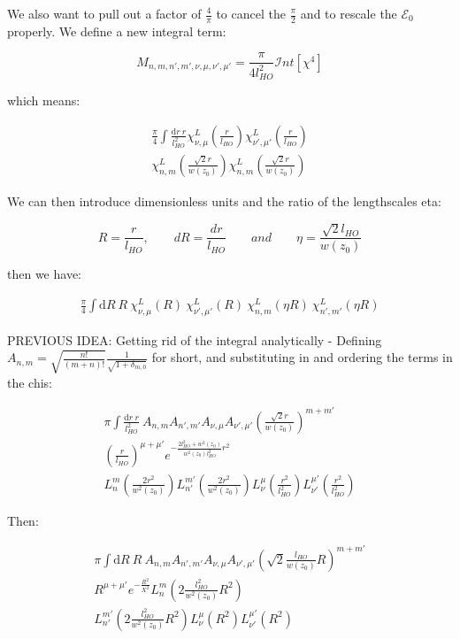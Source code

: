 \documentclass[a4paper,twocolumn,nobalancelastpage]{revtex4-1}
\newcommand{\lho}{l_{HO}}
\newcommand{\wz}{w(z_0)}
\newcommand{\chiaf}{\chi_{\nu,\mu}^L\left(\frac{r}{\lho}\right)}
\newcommand{\chiafp}{\chi_{\nu',\mu'}^L\left(\frac{r}{\lho}\right)}
\newcommand{\chilf}{\chi_{n,m}^L\left(\frac{\sqrt{2}r}{w(z_0)}\right)}
\newcommand{\chilfp}{\chi_{n,m}^L\left(\frac{\sqrt{2}r}{w(z_0)}\right)}
\newcommand{\intfour}{\mathcal{I}nt[\chi^4]}
\begin{document}
We also want to pull out a factor of $\frac{4}{\pi}$ to cancel the $\frac{\pi}{2}$ and to rescale the $\mathcal{E}_0$ properly. We define a new integral term:

\begin{equation}
M_{n,m,n',m',\nu,\mu,\nu',\mu'}= \frac{\pi}{4 \lho^2} \intfour
\end{equation}

which means:

\begin{multline}
 \frac{\pi}{4} \int \frac{\mathrm{d}r \ r}{l^2_{HO}} \chiaf \chiafp \\ \chilf \chilfp
\end{multline}

We can then introduce dimensionless units and the ratio of the lengthscales eta:

\begin{equation}
R=\frac{r}{l_{HO}}, \qquad dR=\frac{dr}{l_{HO}} \qquad and \qquad \eta=\frac{\sqrt{2}\lho}{\wz} 
\end{equation}

then we have:

\begin{multline}
 \frac{\pi}{4} \int \mathrm{d}R \ R \ \chi_{\nu, \mu}^L (R) \ \chi_{\nu', \mu'}^L (R) \ \chi_{n,m}^L (\eta R) \ \chi_{n',m'}^L (\eta R)
\end{multline}


PREVIOUS IDEA: Getting rid of the integral analytically - 
Defining $A_{n,m}=\sqrt{\frac{n!}{(m+n)!}} \frac{1}{\sqrt{1+\delta_{m,0}}}$ for short, and substituting in and ordering the terms in the chis:


\begin{multline}
\pi \int \frac{\mathrm{d}r \ r}{l^2_{HO}} \ 
A_{n,m}  A_{n',m'} A_{\nu,\mu} A_{\nu',\mu'} \left(\frac{\sqrt{2}r}{w(z_{0})}\right)^{m+m'} \\ \left(\frac{r}{l_{HO}}\right)^{\mu+\mu'}
 e^{- \frac{2 l^2_{HO}+w^2(z_0)}{w^2(z_0) l_{HO}^2} r^2} \\ L^m_n\left(\frac{2r^2}{w^2(z_{0})}\right) L^{m'}_{n'}\left(\frac{2r^2}{w^2(z_{0})}\right)  L^{\mu}_{\nu}\left(\frac{r^2}{l^2_{HO}}\right) L^{\mu'}_{\nu'}\left(\frac{r^2}{l^2_{HO}}\right)
\end{multline}




Then:

\begin{multline}
\pi \int \mathrm{d}R \ R \ 
A_{n,m}  A_{n',m'} A_{\nu,\mu} A_{\nu',\mu'} \left(\sqrt{2}\frac{l_{HO}}{w(z_{0})}R\right)^{m+m'} \\ R^{\mu+\mu'} e^{- \frac{R^2}{X^2}}
  L^m_n\left(2\frac{l^2_{HO}}{w^2(z_{0})}R^2\right) \\  L^{m'}_{n'}\left(2\frac{l^2_{HO}}{w^2(z_{0})}R^2\right)  L^{\mu}_{\nu}\left( R^2 \right) L^{\mu'}_{\nu'}\left(R^2\right)
\end{multline}
\end{document}
